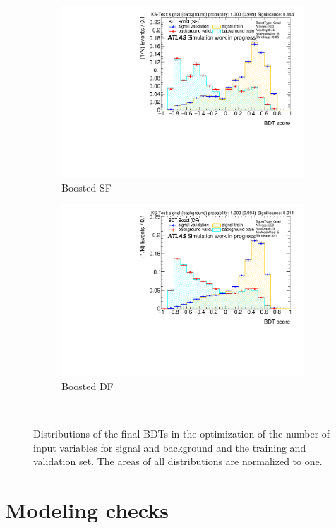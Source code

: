 \begin{figure}[htbp]
\begin{subfigure}[t]{0.49\textwidth}
        \includegraphics[width=\textwidth]{./plots/mva/variable_reduction/BOOST_SF_bdt_output_clean.pdf}
        \caption{Boosted SF}
    \end{subfigure}
    \begin{subfigure}[t]{0.49\textwidth}
        \includegraphics[width=\textwidth]{./plots/mva/variable_reduction/BOOST_DF_bdt_output_clean.pdf}
        \caption{Boosted DF}
    \end{subfigure}
    \caption{Distributions of the final BDTs in the optimization of the number of input variables for signal and background and the training and validation set.
             The areas of all distributions are normalized to one.}~\label{fig:mva:varopt:bdts}
\end{figure}


\section{Modeling checks}\label{sec:mva:modeling}

